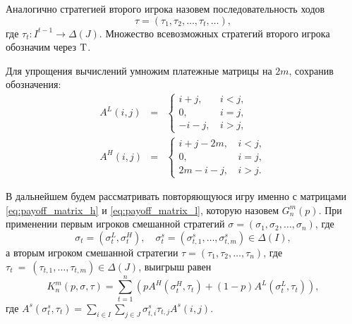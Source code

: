Аналогично стратегией второго игрока назовем последовательность ходов
\[
  \tau = (\tau_1, \tau_2, \ldots, \tau_t, \ldots),
\]
где $ \tau_t: I^{t-1} \rightarrow \Delta(J) $. Множество всевозможных стратегий второго игрока обозначим через $ \mathrm{T} $.

Для упрощения вычислений умножим платежные матрицы на $ 2m $, сохранив обозначения:
\begin{eqnarray}
\label{eq:payoff_matrix_h}
A^L(i, j) &=& \begin{cases}
  i + j, &\, i < j, \\
  0, &\, i = j, \\
  -i - j, &\, i > j,
\end{cases}
\\
\label{eq:payoff_matrix_l}
A^H(i, j) &=& \begin{cases}
  i + j - 2m, &\, i < j, \\
  0, &\, i = j, \\
  2m - i - j, &\, i > j.
\end{cases}
\end{eqnarray}

В дальнейшем будем рассматривать повторяющуюся игру именно с матрицами \eqref{eq:payoff_matrix_h} и \eqref{eq:payoff_matrix_l}, которую назовем $ G_n^m(p) $. При применении первым игроков смешанной стратегий 
$ \sigma = (\sigma_1, \sigma_2, \ldots, \sigma_n) $, где 
\[ 
  \sigma_t = (\sigma_t^L, \sigma_t^H), \quad
  \sigma^s_t = (\sigma^s_{t, 1}, \ldots, \sigma^s_{t, m}) \in \Delta(I),
\] 
а вторым игроком смешанной стратегии 
$ \tau = (\tau_1, \tau_2, \ldots, \tau_n) $, где
$ \tau_t~=~(\tau_{t, 1}, \ldots, \tau_{t, m}) \in \Delta(J) $,
выигрыш равен
\begin{equation}
\label{eq:value_of_game_n}
K_n^m(p, \sigma, \tau) = \sum_{t=1}^n
    \left(
        pA^H(\sigma_t^H, \tau_t) + (1 - p)A^L(\sigma_t^L, \tau_t)
    \right),
\end{equation}
где 
$ 
  A^s(\sigma^s_t,\tau_t) = 
    \sum_{i \in I}
      \sum_{j \in J}
        \sigma^s_{t, i} \tau_{t, j} A^s(i, j).
$